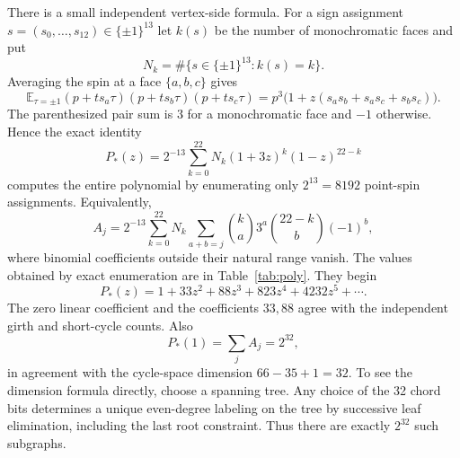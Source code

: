 \documentclass[11pt]{article}
\numberwithin{equation}{section}
\theoremstyle{definition}
\theoremstyle{remark}
\newcommand{\E}{\mathbb E}
\begin{document}
There is a small independent vertex-side formula. For a sign assignment
$s=(s_0,\ldots,s_{12})\in\{\pm1\}^{13}$ let $k(s)$ be the number of
monochromatic faces and put
\begin{equation}
 N_k=\#\{s\in\{\pm1\}^{13}:k(s)=k\}.
 \label{eq:Nk}
\end{equation}
Averaging the spin at a face $\{a,b,c\}$ gives
\[
 \E_{\tau=\pm1}(p+ts_a\tau)(p+ts_b\tau)(p+ts_c\tau)
   =p^3\bigl(1+z(s_as_b+s_as_c+s_bs_c)\bigr).
\]
The parenthesized pair sum is $3$ for a monochromatic face and $-1$
otherwise. Hence the exact identity
\begin{equation}
 P_*(z)=2^{-13}\sum_{k=0}^{22}N_k(1+3z)^k(1-z)^{22-k}
 \label{eq:Pstar-primal}
\end{equation}
computes the entire polynomial by enumerating only $2^{13}=8192$
point-spin assignments. Equivalently,
\begin{equation}
 A_j=2^{-13}\sum_{k=0}^{22}N_k
       \sum_{a+b=j}\binom ka3^a\binom{22-k}{b}(-1)^b,
 \label{eq:Aj}
\end{equation}
where binomial coefficients outside their natural range vanish.
The values obtained by exact enumeration are in Table~\ref{tab:poly}.
They begin
\[
 P_*(z)=1+33z^2+88z^3+823z^4+4232z^5+\cdots.
\]
The zero linear coefficient and the coefficients $33,88$ agree with
the independent girth and short-cycle counts. Also
\begin{equation}
 P_*(1)=\sum_j A_j=2^{32},
 \label{eq:Pstar-one}
\end{equation}
in agreement with the cycle-space dimension
$66-35+1=32$. To see the dimension formula directly, choose a spanning
tree. Any choice of the 32 chord bits determines a unique even-degree
labeling on the tree by successive leaf elimination, including the
last root constraint. Thus there are exactly $2^{32}$ such subgraphs.
\end{document}
